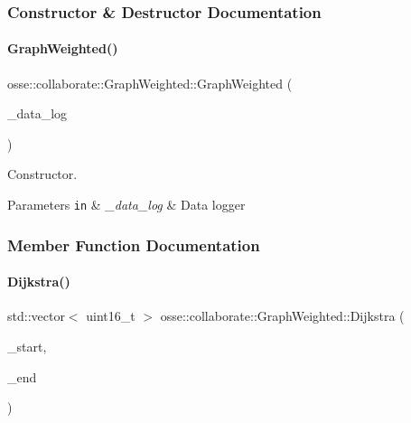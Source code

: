 \subsubsection{Constructor \& Destructor Documentation}
\mbox{\label{classosse_1_1collaborate_1_1_graph_weighted_a983e8d0efd6bba488b979b546cb078ff}} 
\paragraph{\texorpdfstring{Graph\+Weighted()}{GraphWeighted()}}
{\footnotesize\ttfamily osse\+::collaborate\+::\+Graph\+Weighted\+::\+Graph\+Weighted (\begin{DoxyParamCaption}\item[{\hyperlink{classosse_1_1collaborate_1_1_data_logger}{Data\+Logger} $\ast$}]{\+\_\+data\+\_\+log }\end{DoxyParamCaption})\hspace{0.3cm}{\ttfamily [explicit]}}



Constructor. 


\begin{DoxyParams}[1]{Parameters}
\mbox{\tt in}  & {\em \+\_\+data\+\_\+log} & Data logger \\
\hline
\end{DoxyParams}


\subsubsection{Member Function Documentation}
\mbox{\label{classosse_1_1collaborate_1_1_graph_weighted_a657a68399222496d6664418061fe2108}} 
\paragraph{\texorpdfstring{Dijkstra()}{Dijkstra()}}
{\footnotesize\ttfamily std\+::vector$<$ uint16\+\_\+t $>$ osse\+::collaborate\+::\+Graph\+Weighted\+::\+Dijkstra (\begin{DoxyParamCaption}\item[{const uint16\+\_\+t \&}]{\+\_\+start,  }\item[{const uint16\+\_\+t \&}]{\+\_\+end }\end{DoxyParamCaption})}



